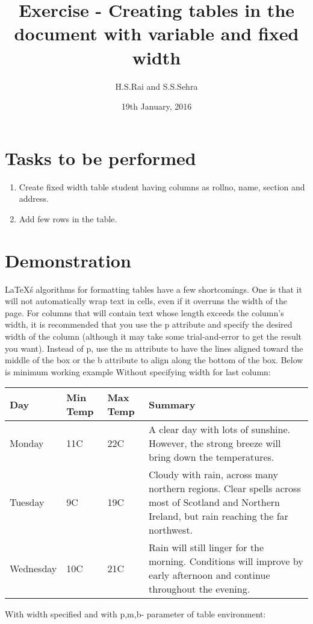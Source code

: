 \documentclass{article}
\title{Exercise  - Creating tables in the document with variable and fixed width}
\author{H.S.Rai and S.S.Sehra}
\date{19th January, 2016}
\begin{document}
	\maketitle	
	
	\section*{Tasks to be performed}
	\begin{enumerate}	
		\item Create fixed width table student having columns as rollno, name, section and address.
		\item Add few rows in the table.
	\end{enumerate}
	\section*{Demonstration}
	\LaTeX\'s algorithms for formatting tables have a few shortcomings. One is that it will not automatically wrap text in cells, even if it overruns the width of the page. For columns that will contain text whose length exceeds the column's width, it is recommended that you use the p attribute and specify the desired width of the column (although it may take some trial-and-error to get the result you want).
	Instead of p, use the m attribute to have the lines aligned toward the middle of the box or the b attribute to align along the bottom of the box. Below is minimum working example
Without specifying width for last column:
\begin{center}
    \begin{tabular}{| l | l | l | l |}
    \hline
    Day & Min Temp & Max Temp & Summary \\ \hline
    Monday & 11C & 22C & A clear day with lots of sunshine.
    However, the strong breeze will bring down the temperatures. \\ \hline
    Tuesday & 9C & 19C & Cloudy with rain, across many northern regions. Clear spells 
    across most of Scotland and Northern Ireland, 
    but rain reaching the far northwest. \\ \hline
    Wednesday & 10C & 21C & Rain will still linger for the morning. 
    Conditions will improve by early afternoon and continue 
    throughout the evening. \\
    \hline
    \end{tabular}
\end{center}
\newpage
With width specified and with p,m,b- parameter of table environment:
\end{document}
